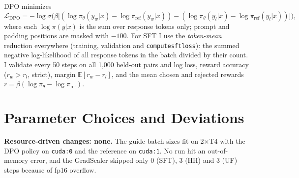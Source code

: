 \documentclass[10pt]{article}
\newcommand{\code}[1]{\texttt{\small #1}}
\renewcommand{\_}{\oldunderscore\allowbreak}
\begin{document}
DPO minimizes
\[\mathcal{L}_{\text{DPO}}=-\log\sigma\Big(\beta\big[(\log\pi_\theta(y_w|x)-\log\pi_{\text{ref}}(y_w|x))-(\log\pi_\theta(y_l|x)-\log\pi_{\text{ref}}(y_l|x))\big]\Big),\]
where each $\log\pi(y|x)$ is the sum over response tokens only; prompt and padding positions are masked with $-100$. For SFT I use the \emph{token-mean} reduction everywhere (training, validation and \code{compute\_sft\_loss}): the summed negative log-likelihood of all response tokens in the batch divided by their count. I validate every 50 steps on all 1,000 held-out pairs and log loss, reward accuracy ($r_w>r_l$, strict), margin $\mathbb{E}[r_w-r_l]$, and the mean chosen and rejected rewards $r=\beta(\log\pi_\theta-\log\pi_{\text{ref}})$.

\section{Parameter Choices and Deviations}

\textbf{Resource-driven changes: none.} The guide batch sizes fit on 2$\times$T4 with the DPO policy on \code{cuda:0} and the reference on \code{cuda:1}. No run hit an out-of-memory error, and the GradScaler skipped only 0 (SFT), 3 (HH) and 3 (UF) steps because of fp16 overflow.
\end{document}
